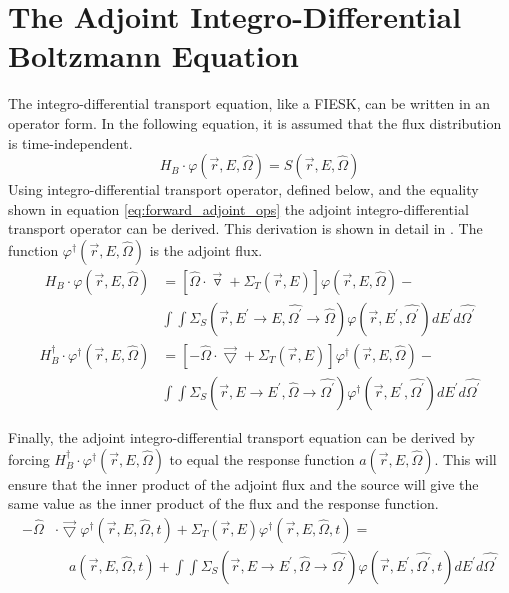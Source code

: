 \section{The Adjoint Integro-Differential Boltzmann Equation}
The integro-differential transport equation, like a FIESK, can be written in an
operator form. In the following equation, it is assumed that the flux 
distribution is time-independent.
\begin{equation}
  H_B \cdot \varphi(\vec{r},E,\hat{\Omega}) = S(\vec{r},E,\hat{\Omega})
\end{equation}
Using integro-differential transport operator, defined below, and the equality
shown in equation \ref{eq:forward_adjoint_ops} the adjoint integro-differential
transport operator can be derived. This derivation is shown in detail in 
\citep{lewis}. The function $\varphi^{\dagger}(\vec{r},E,\hat{\Omega})$ is the
adjoint flux.
\begin{equation}
  \begin{split}
    H_B \cdot \varphi(\vec{r},E,\hat{\Omega}) &= 
    \left[ \hat{\Omega} \cdot \vec{\triangledown} +
     \Sigma_T(\vec{r},E) \right] \varphi(\vec{r},E,\hat{\Omega}) - \\
     & \int\int \Sigma_S(\vec{r},E^{'} \to E,\hat{\Omega^{'}} \to \hat{\Omega})
    \varphi(\vec{r},E^{'},\hat{\Omega^{'}}) dE^{'} d\hat{\Omega^{'}}
  \end{split}
  \label{eq:integro_diff_trans_op}
\end{equation}
\begin{equation}
  \begin{split}
    H_B^{\dagger} \cdot \varphi^{\dagger}(\vec{r},E,\hat{\Omega}) &= 
    \left[ -\hat{\Omega} \cdot \vec{\bigtriangledown} +
     \Sigma_T(\vec{r},E) \right] \varphi^{\dagger}(\vec{r},E,\hat{\Omega}) - \\
     & \int\int \Sigma_S(\vec{r},E \to E^{'},\hat{\Omega} \to \hat{\Omega^{'}})
    \varphi^{\dagger}(\vec{r},E^{'},\hat{\Omega^{'}}) dE^{'} d\hat{\Omega^{'}}
  \end{split}
  \label{eq:integro_diff_adj_trans_op}
\end{equation}

Finally, the adjoint integro-differential transport equation can be derived by
forcing $H_B^{\dagger} \cdot \varphi^{\dagger}(\vec{r},E,\hat{\Omega})$ to equal
the response function $a(\vec{r},E,\hat{\Omega})$. This will ensure that the
inner product of the adjoint flux and the source will give the same value as
the inner product of the flux and the response function.
\begin{equation}
  \begin{split}
    -\hat{\Omega} &\cdot \vec{\bigtriangledown} 
    \varphi^{\dagger}(\vec{r},E,\hat{\Omega},t)
    + \Sigma_T(\vec{r},E) \varphi^{\dagger}(\vec{r},E,\hat{\Omega},t) = \\
    & \quad a(\vec{r},E,\hat{\Omega},t) +
    \int\int \Sigma_S(\vec{r},E \to E^{'},\hat{\Omega} \to \hat{\Omega^{'}})
    \varphi(\vec{r},E^{'},\hat{\Omega^{'}},t) dE^{'}d\hat{\Omega^{'}} 
  \end{split}
  \label{eq:integro_diff_boltzmann_eqn}
\end{equation}

